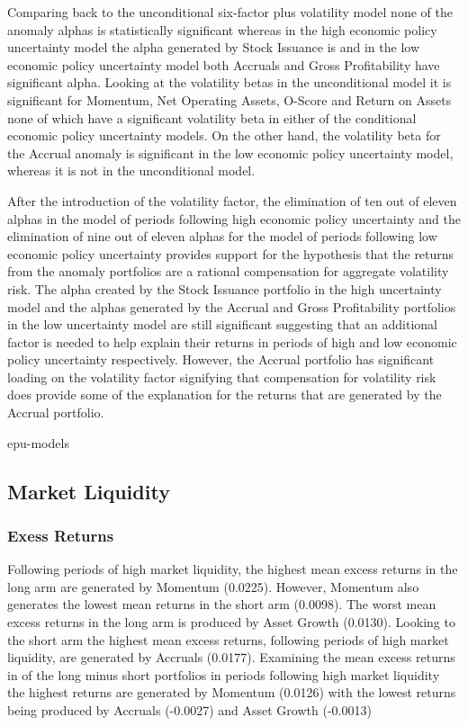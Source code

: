 \documentclass[12pt, a4paper, oneside]{article}
\begin{document}
Comparing back to the unconditional six-factor plus volatility model none of the anomaly alphas is statistically significant whereas in the high economic policy uncertainty model the alpha generated by Stock Issuance is and in the low economic policy uncertainty model both Accruals and Gross Profitability have significant alpha. Looking at the volatility betas in the unconditional model it is significant for Momentum, Net Operating Assets, O-Score and Return on Assets none of which have a significant volatility beta in either of the conditional economic policy uncertainty models. On the other hand, the volatility beta for the Accrual anomaly is significant in the low economic policy uncertainty model, whereas it is not in the unconditional model.

After the introduction of the volatility factor, the elimination of ten out of eleven alphas in the model of periods following high economic policy uncertainty and the elimination of nine out of eleven alphas for the model of periods following low economic policy uncertainty provides support for the hypothesis that the returns from the anomaly portfolios are a rational compensation for aggregate volatility risk. The alpha created by the Stock Issuance portfolio in the high uncertainty model and the alphas generated by the Accrual and Gross Profitability portfolios in the low uncertainty model are still significant suggesting that an additional factor is needed to help explain their returns in periods of high and low economic policy uncertainty respectively. However, the Accrual portfolio has significant loading on the volatility factor signifying that compensation for volatility risk does provide some of the explanation for the returns that are generated by the Accrual portfolio.

{epu-models}

\subsection{Market Liquidity}
\subsubsection{Exess Returns}
Following periods of high market liquidity, the highest mean excess returns in the long arm are generated by Momentum (0.0225). However, Momentum also generates the lowest mean returns in the short arm (0.0098). The worst mean excess returns in the long arm is produced by Asset Growth (0.0130). Looking to the short arm the highest mean excess returns, following periods of high market liquidity, are generated by Accruals (0.0177). Examining the mean excess returns in of the long minus short portfolios in periods following high market liquidity the highest returns are generated by Momentum (0.0126) with the lowest returns being produced by Accruals (-0.0027) and Asset Growth (-0.0013)
\end{document}
